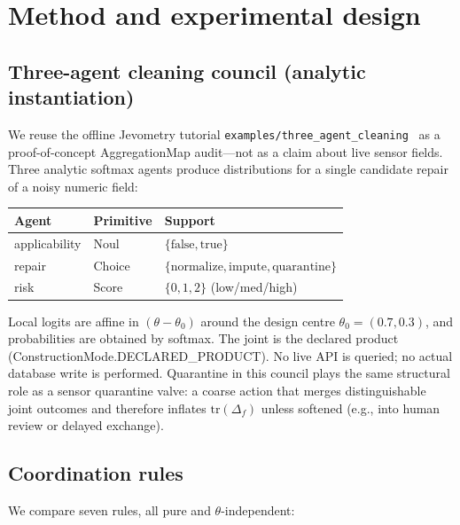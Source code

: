 \documentclass[11pt,a4paper]{article}
\begin{document}
\section{Method and experimental design}
\label{sec:method}

\subsection{Three-agent cleaning council
(analytic instantiation)}

We reuse the offline Jevometry tutorial
\texttt{examples/three\_agent\_cleaning}~\citep{jevometry2026} as a
proof-of-concept AggregationMap audit---not as a claim about live sensor
fields. Three analytic softmax agents produce distributions for a single
candidate repair of a noisy numeric field:

\begin{center}
\begin{tabular}{lll}
\toprule
Agent & Primitive & Support \\
\midrule
applicability & Noul & $\{\mathrm{false},\mathrm{true}\}$ \\
repair & Choice & $\{\mathrm{normalize},\mathrm{impute},\mathrm{quarantine}\}$ \\
risk & Score & $\{0,1,2\}$ (low/med/high) \\
\bottomrule
\end{tabular}
\end{center}

Local logits are affine in $(\theta-\theta_0)$ around the design centre
$\theta_0=(0.7,0.3)$, and probabilities are obtained by softmax. The joint
is the declared product (ConstructionMode.DECLARED\_PRODUCT). No live API is
queried; no actual database write is performed. Quarantine in this council
plays the same structural role as a sensor quarantine valve: a coarse action
that merges distinguishable joint outcomes and therefore inflates
$\mathrm{tr}(\Delta_f)$ unless softened (e.g., into human review or delayed
exchange).

\subsection{Coordination rules}
\label{sec:rules}

We compare seven rules, all pure and $\theta$-independent:
\end{document}
